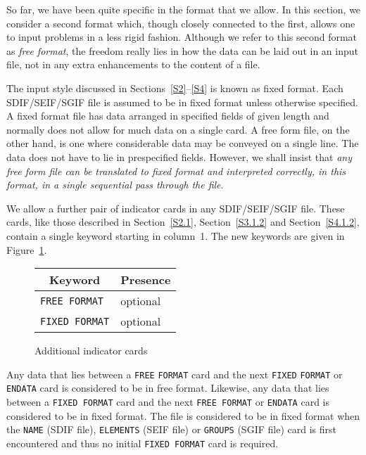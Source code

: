 \documentclass[a4paper]{article}
\newcommand{\bcftable}[1]{\begin{figure}[htbp]
                          \begin{center}
                          \begin{tabular}{#1} }
\newcommand{\ecftable}[1]{\end{tabular}
                          \caption{#1}
                          \end{center}
                          \end{figure} }
\begin{document}
So far, we have been  quite  specific in the  format that we allow. In
this section,  we  consider  a  second  format   which, though closely
connected to the first, allows one  to input problems  in a less rigid
fashion. Although we refer to this second format as {\em free format},
the freedom really lies in how the  data can be  laid  out in an input
file, not in any extra enhancements to the content of a file.

The input style discussed  in Sections~\ref{S2}--\ref{S4} is  known as
fixed format.
Each  SDIF/SEIF/SGIF file  is  assumed to be in  fixed  format  unless
otherwise   specified.   A  fixed  format  file  has data  arranged in
specified fields
of given length and normally does not allow for  much data on a single
card.
A free form
file,   on the  other hand,  is  one  where  considerable data may  be
conveyed  on   a single  line.   The  data   does not   have to lie in
prespecified fields.
However, we  shall   insist  that  {\em any   free  form file  can  be
translated to fixed format  and interpreted correctly, in this format,
in a single sequential pass through the file}.

We allow a further pair of indicator cards
in any SDIF/SEIF/SGIF file.
These   cards,     like   those  described     in  Section~\ref{S2.1},
Section~\ref{S3.1.2} and Section~\ref{S4.1.2},     contain  a   single
keyword   starting in   column~1.    The new keywords   are given   in
Figure~\ref{F5.1}.

\bcftable{ll}
\multicolumn{1}{c}{Keyword} & \multicolumn{1}{c}{Presence}\\
\hline
{\tt FREE FORMAT} & optional \\
{\tt FIXED FORMAT} & optional \\
\ecftable{\label{F5.1}Additional indicator cards}

Any data that lies between a {\tt FREE} {\tt FORMAT}
card  and  the  next {\tt  FIXED} {\tt FORMAT}
or  {\tt  ENDATA}
card is considered to be in free format.
Likewise, any data that lies between a {\tt FIXED FORMAT} card
and the next {\tt FREE FORMAT}
or
{\tt  ENDATA}
card is considered  to be in fixed format.
The file is considered to be in fixed format when the {\tt NAME}
(SDIF file), {\tt ELEMENTS}
(SEIF  file)  or {\tt  GROUPS}
(SGIF file) card
is first encountered and  thus no initial {\tt FIXED
FORMAT}
card is required.
\end{document}
